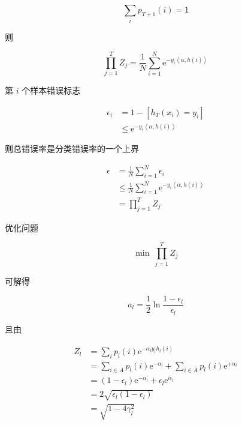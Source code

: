 \documentclass[openany,a4paper,12pt]{ctexbook}
\theoremstyle{kaiti}
\theoremstyle{normal}
\begin{document}
\begin{equation}
\sum_ip_{T+1}(i)=1 
\end{equation}

则

\begin{equation}
\prod_{j=1}^{T}Z_j=\frac{1}{N}\sum_{i=1}^N\mathrm{e}^{-y_i\left< \alpha ,h(i)\right>}
\end{equation}

第 $i$ 个样本错误标志

\begin{equation}
\begin{aligned}
  \epsilon_i
  &=1-\left[h_T\left(x_i \right)=y_i \right] \\
  &\leqslant \mathrm{e}^{-y_i\left< \alpha ,h(i)\right>}
\end{aligned}
\end{equation}

则总错误率是分类错误率的一个上界

\begin{equation}
\begin{aligned}
  \epsilon 
  &=\frac{1}{N}\sum_{i=1}^N\epsilon_i\\
  &\leqslant\frac{1}{N}\sum_{i=1}^N\mathrm{e}^{-y_i\left< \alpha ,h(i)\right>}\\
  &=\prod_{j=1}^{T}Z_j
\end{aligned}
\end{equation}

优化问题

\begin{equation}
\min~\prod_{j=1}^{T}Z_j
\end{equation}

可解得

\begin{equation}
a_l=\frac{1}{2}\ln\frac{1-\epsilon_l}{\epsilon_l}
\end{equation}

且由

\begin{equation}
\begin{aligned}
  Z_l
  &=\sum_ip_l(i)\mathrm{e}^{-\alpha_ly_ih_l(i)}\\
  &=\sum_{i\in A}p_l(i)\mathrm{e}^{-\alpha_l}+\sum_{i\in \bar{A}}p_l(i)\mathrm{e}^{+\alpha_l}\\
  &=\left(1-\epsilon_l \right)\mathrm{e}^{-\alpha_l}+\epsilon_l\mathrm{e}^{\alpha_l}\\
  &=2\sqrt{\epsilon_l\left(1-\epsilon_l \right)}\\
  &=\sqrt{1-4\gamma_{l}^{2}}
\end{aligned}
\end{equation}
\end{document}
